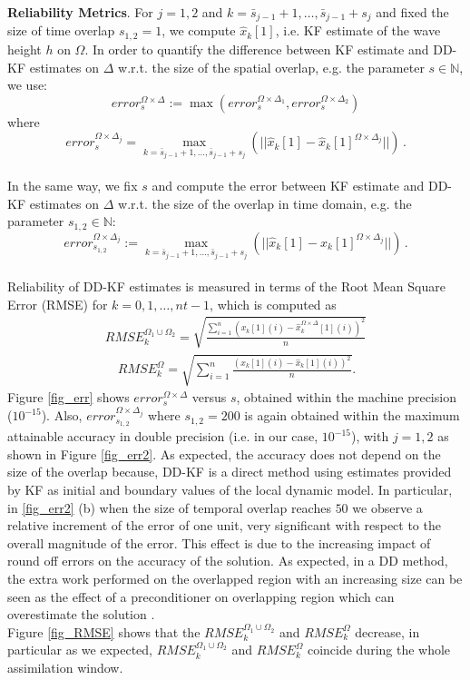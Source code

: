 \documentclass[smallcondensed]{svjour3}
\begin{document}
\noindent \textbf{Reliability Metrics}.
\noindent For $j=1,2$ and $k=\bar{s}_{j-1}+1,\ldots,\bar{s}_{j-1}+s_{j}$ and fixed the size of time overlap $s_{1,2}=1$, we compute $\widehat{x}_{k}[1]$, i.e.  KF estimate  of the wave height $h$ on $\Omega$. In order to quantify the difference between  KF estimate and  DD-KF estimates on $\Delta$ w.r.t. the size of the spatial overlap, e.g. the parameter  $s\in \mathbb{N}$, we use: $$error_{s}^{\Omega\times \Delta}:=\max(error_{s}^{\Omega\times \Delta_{1}},error_{s}^{\Omega\times \Delta_{2}})$$ where $$error_{s}^{\Omega\times \Delta_{j}}=\max_{k=\bar{s}_{j-1}+1,\ldots,\bar{s}_{j-1}+s_{j}}(||\widehat{x}_{k}[1]-\widehat{x}_{k}[1]^{\Omega\times \Delta_{j}}||)\,.$$ \\
 In the same way, we fix $s$  and compute the error between  KF estimate and  DD-KF estimates on $\Delta$ w.r.t. the size of the  overlap in time domain, e.g. the parameter  $s_{1,2}\in \mathbb{N}$:  $$error_{s_{1,2}}^{\Omega\times \Delta_{j}}:=\max_{k=\bar{s}_{j-1}+1,\ldots,\bar{s}_{j-1}+s_{j}}(||\widehat{x}_{k}[1]-\widehat{x}_{k}[1]^{\Omega\times \Delta_{j}}||)\,.$$\\

\noindent  Reliability of  DD-KF estimates is measured in terms of the Root Mean Square Error (RMSE) for $ k=0,1,\ldots,nt-1$, which is computed as
\begin{equation}
\begin{array}{ll}
RMSE_{k}^{\Omega_{1}\cup \Omega_{2}}=\sqrt{\frac{\sum_{i=1}^{n}({x}_{k}[1](i)-\widehat{x}_{k}^{\Omega\times \Delta}[1](i))^{2}}{n}} \\\quad
RMSE_{k}^{\Omega}=\sqrt{\sum_{i=1}^{n}\frac{({x}_{k}[1](i)-\widehat{x}_{k}[1](i))^{2}}{n}}.
\end{array}
\end{equation}
\noindent  Figure \ref{fig_err} shows $error_{s}^{\Omega\times \Delta}$ versus $s$,  obtained within the machine precision ($10^{-15}$). Also,  $error_{s_{1,2}}^{\Omega\times \Delta_{j}}$ where $s_{1,2}=200$ is again obtained  within the maximum attainable accuracy in double precision (i.e. in our case,  $10^{-15}$), with $j=1,2$ as shown in Figure \ref{fig_err2}.  As  expected,  the accuracy does not depend on the size of the overlap because,  DD-KF   is  a direct method using  estimates provided by KF as initial and boundary values of  the local dynamic model. In particular, in \ref{fig_err2} (b) when the size of temporal overlap reaches $50$ we observe a  relative  increment of the error of one unit, very significant with respect to the overall magnitude of the error.  This effect is due to the increasing impact of  round off errors on the accuracy of the solution. As expected, in a DD method, the extra work  performed on the overlapped region with an  increasing  size can be seen as the effect of a preconditioner on  overlapping region which can overestimate the solution \cite{Chan}.\\
\noindent  Figure \ref{fig_RMSE} shows that the $RMSE_{k}^{\Omega_{1}\cup \Omega_{2}}$ and $RMSE_{k}^{\Omega}$ decrease, in particular as we expected, $RMSE_{k}^{\Omega_{1}\cup \Omega_{2}}$ and $RMSE_{k}^{\Omega}$ coincide during the whole assimilation window.\\
\end{document}
